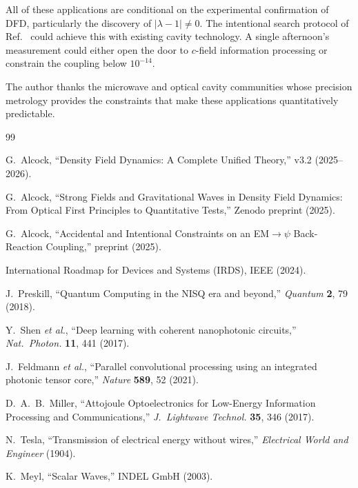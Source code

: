 \documentclass[aps,prd,twocolumn,superscriptaddress,nofootinbib,floatfix]{revtex4-2}
\begin{document}
All of these applications are conditional on the experimental
confirmation of DFD, particularly the discovery of
$|\lambda-1| \neq 0$. The intentional search protocol of
Ref.~\cite{Alcock2025EMCoupling} could achieve this with
existing cavity technology. A single afternoon's measurement
could either open the door to $c$-field information processing
or constrain the coupling below $10^{-14}$.

\begin{acknowledgments}
The author thanks the microwave and optical cavity communities
whose precision metrology provides the constraints that make
these applications quantitatively predictable.
\end{acknowledgments}

\begin{thebibliography}{99}

G.~Alcock, ``Density Field Dynamics: A Complete Unified Theory,''
v3.2 (2025--2026).

G.~Alcock, ``Strong Fields and Gravitational Waves in Density
Field Dynamics: From Optical First Principles to Quantitative
Tests,'' Zenodo preprint (2025).

G.~Alcock, ``Accidental and Intentional Constraints on an
EM$\to\psi$ Back-Reaction Coupling,'' preprint (2025).

International Roadmap for Devices and Systems (IRDS),
IEEE (2024).

J.~Preskill, ``Quantum Computing in the NISQ era and beyond,''
\textit{Quantum} \textbf{2}, 79 (2018).

Y.~Shen \textit{et al.}, ``Deep learning with coherent nanophotonic
circuits,'' \textit{Nat.\ Photon.} \textbf{11}, 441 (2017).

J.~Feldmann \textit{et al.}, ``Parallel convolutional processing
using an integrated photonic tensor core,'' \textit{Nature}
\textbf{589}, 52 (2021).

D.~A.~B.~Miller, ``Attojoule Optoelectronics for Low-Energy
Information Processing and Communications,''
\textit{J.\ Lightwave Technol.} \textbf{35}, 346 (2017).

N.~Tesla, ``Transmission of electrical energy without wires,''
\textit{Electrical World and Engineer} (1904).

K.~Meyl, ``Scalar Waves,'' INDEL GmbH (2003).


\end{thebibliography}
\end{document}
